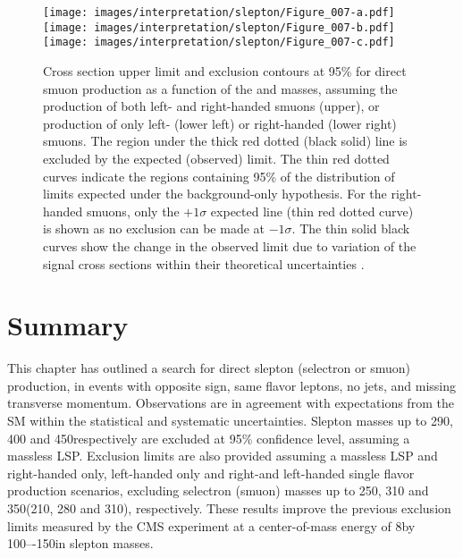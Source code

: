  \begin{figure}[htbp]
\centering
\texttt{[image: images/interpretation/slepton/Figure\_007-a.pdf]} \\
\texttt{[image: images/interpretation/slepton/Figure\_007-b.pdf]}
\texttt{[image: images/interpretation/slepton/Figure\_007-c.pdf]}
\caption{\label{fig:TOTmm}
Cross section upper limit and exclusion contours at 95\% \CL for direct smuon production
as a function of the \lsp and \slep masses, assuming the production of both left- and right-handed smuons
(upper), or production of only left- (lower left) or right-handed (lower right) smuons.
The region under the thick red dotted (black solid) line is excluded by the expected (observed) limit.
The thin red dotted curves indicate the regions containing 95\% of the distribution of limits
expected under the background-only hypothesis. For the right-handed smuons, only the $+1\sigma$ expected line (thin red dotted curve) is shown as no exclusion can be made at $-1\sigma$.
The thin solid black curves show the change in the observed limit due to
variation of the signal cross sections within their theoretical uncertainties \cite{Sirunyan:2018nwe}.}
\end{figure}
\section{Summary}
\noindent
\justify
This chapter has outlined a search for direct slepton (selectron or smuon) production, in events with opposite sign, same flavor leptons, no jets, and missing transverse momentum.
Observations are in agreement with expectations from the SM within the statistical and systematic uncertainties.
Slepton masses up to 290, 400 and 450\GeV respectively are excluded at 95\% confidence level, assuming a massless LSP. 
Exclusion limits are also provided assuming a massless LSP and right-handed only, left-handed only and right-and left-handed single flavor production scenarios, excluding selectron (smuon) masses up to 250, 310 and 350\GeV (210, 280 and 310\GeV), respectively.
These results improve the previous exclusion limits measured by the CMS experiment at a center-of-mass energy of 8\TeV by 100–-150\GeV in slepton masses.
